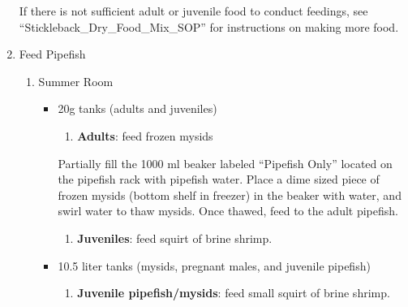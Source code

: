 \documentclass[
  letterpaper,
  DIV=11,
  numbers=noendperiod]{scrreprt}
\providecommand{\tightlist}{%
  \setlength{\itemsep}{0pt}\setlength{\parskip}{0pt}}\usepackage{longtable,booktabs,array}
\begin{document}
\begin{enumerate}
\begin{tcolorbox}
  If there is not sufficient adult or juvenile food to conduct feedings,
  see ``Stickleback\_Dry\_Food\_Mix\_SOP'' for instructions on making
  more food.

  \end{tcolorbox}
\item
  Feed Pipefish

  \begin{enumerate}
  \def\labelenumii{\arabic{enumii}.}
  \item
    Summer Room

    \begin{itemize}
    \item
      20g tanks (adults and juveniles)

      \begin{enumerate}
      \def\labelenumiii{\arabic{enumiii}.}
      \tightlist
      \item
        \textbf{Adults}: feed frozen mysids
      \end{enumerate}

      \begin{tcolorbox}[enhanced jigsaw, rightrule=.15mm, title=\textcolor{quarto-callout-warning-color}{\faExclamationTriangle}\hspace{0.5em}{NOTE FOR PREPARING AND FEEDING FROZEN MYSIDS}, titlerule=0mm, opacitybacktitle=0.6, toprule=.15mm, bottomrule=.15mm, opacityback=0, left=2mm, colframe=quarto-callout-warning-color-frame, breakable, coltitle=black, colback=white, colbacktitle=quarto-callout-warning-color!10!white, bottomtitle=1mm, leftrule=.75mm, toptitle=1mm, arc=.35mm]

      Partially fill the 1000 ml beaker labeled ``Pipefish Only''
      located on the pipefish rack with pipefish water. Place a dime
      sized piece of frozen mysids (bottom shelf in freezer) in the
      beaker with water, and swirl water to thaw mysids. Once thawed,
      feed to the adult pipefish.

      \end{tcolorbox}

      \begin{enumerate}
      \def\labelenumiii{\arabic{enumiii}.}
      \setcounter{enumiii}{1}
      \tightlist
      \item
        \textbf{Juveniles}: feed squirt of brine shrimp.
      \end{enumerate}
    \item
      10.5 liter tanks (mysids, pregnant males, and juvenile pipefish)

      \begin{enumerate}
      \def\labelenumiii{\arabic{enumiii}.}
      \tightlist
      \item
        \textbf{Juvenile pipefish/mysids}: feed small squirt of brine
        shrimp.
      \end{enumerate}
    \end{itemize}
  \end{enumerate}
\end{enumerate}
\end{document}

